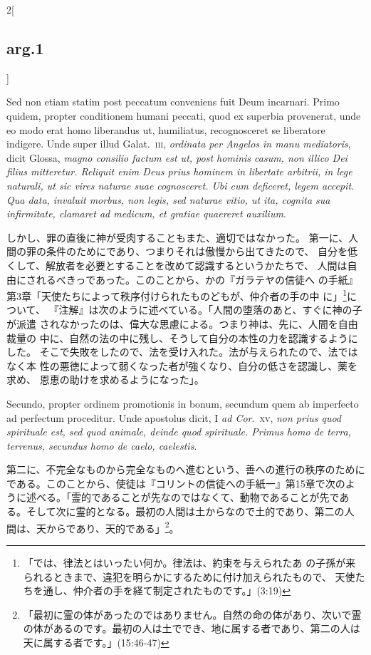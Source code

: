 \documentclass[paper=a4paper,fontsize=10pt,jafontsize=9pt,titlepage]{jlreq}
\begin{document}
\begin{paracol}{2}[\subsection{arg.1}]
\switchcolumn*

Sed non etiam statim post
peccatum conveniens fuit Deum incarnari. 
Primo quidem, propter
conditionem humani peccati, quod ex superbia provenerat, unde eo modo
erat homo liberandus ut, humiliatus, recognosceret se liberatore
indigere. Unde super illud Galat.~{\scshape iii}, {\itshape ordinata per Angelos in manu
mediatoris}, dicit Glossa, {\itshape magno consilio factum est ut, post hominis
casum, non illico Dei filius mitteretur. Reliquit enim Deus prius
hominem in libertate arbitrii, in lege naturali, ut sic vires naturae
suae cognosceret. Ubi cum deficeret, legem accepit. Qua data, invaluit
morbus, non legis, sed naturae vitio, ut ita, cognita sua infirmitate,
clamaret ad medicum, et gratiae quaereret auxilium}.

\switchcolumn

しかし、罪の直後に神が受肉することもまた、適切ではなかった。
第一に、人間の罪の条件のためにであり、つまりそれは傲慢から出てきたので、
 自分を低くして、解放者を必要とすることを改めて認識するというかたちで、
 人間は自由にされるべきっであった。このことから、かの『ガラテヤの信徒へ
 の手紙』第3章「天使たちによって秩序付けられたものどもが、仲介者の手の中
 に」\footnote{「では、律法とはいったい何か。律法は、約束を与えられたあ
 の子孫が来られるときまで、違犯を明らかにするために付け加えられたもので、
 天使たちを通し、仲介者の手を経て制定されたものです。」(3:19)}について、
 『注解』は次のように述べている。「人間の堕落のあと、すぐに神の子が派遣
 されなかったのは、偉大な思慮による。つまり神は、先に、人間を自由裁量の
 中に、自然の法の中に残し、そうして自分の本性の力を認識するようにした。
 そこで失敗をしたので、法を受け入れた。法が与えられたので、法ではなく本
 性の悪徳によって弱くなった者が強くなり、自分の低さを認識し、薬を求め、
 恩恵の助けを求めるようになった」。

\switchcolumn*

Secundo, propter
ordinem promotionis in bonum, secundum quem ab imperfecto ad perfectum
proceditur. Unde apostolus dicit, I {\itshape ad Cor}.~{\scshape xv}, {\itshape non prius quod
spirituale est, sed quod animale, deinde quod spirituale. Primus homo de
terra, terrenus, secundus homo de caelo, caelestis}.

\switchcolumn

第二に、不完全なものから完全なものへ進むという、善への進行の秩序のために
 である。このことから、使徒は『コリントの信徒への手紙一』第15章で次のよ
 うに述べる。「霊的であることが先なのではなくて、動物であることが先であ
 る。そして次に霊的となる。最初の人間は土からなので土的であり、第二の人
 間は、天からであり、天的である」\footnote{「最初に霊の体があったのではありません。自然の命の体があり、次いで霊の体があるのです。最初の人は土ででき、地に属する者であり、第二の人は天に属する者です。」(15:46-47)}。


\end{paracol}
\end{document}
